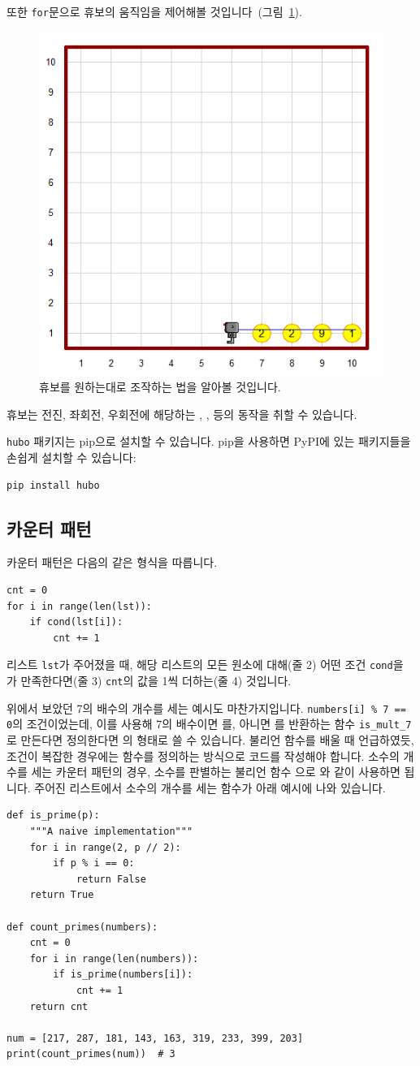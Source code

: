 \documentclass[../main.tex]{subfiles}
\begin{document}
또한 \texttt{for}문으로 휴보의 움직임을 제어해볼 것입니다~(그림~\ref{fig:lecture4:example}).
\begin{figure}[H]
\centering
\includegraphics[width=0.5\linewidth]{"./lectures/lecture4_example"}
\caption{휴보를 원하는대로 조작하는 법을 알아볼 것입니다.}\label{fig:lecture4:example}
\end{figure}
휴보는 전진, 좌회전, 우회전에 해당하는 , ,  등의 동작을 취할 수 있습니다.

\verb/hubo/ 패키지는 pip으로 설치할 수 있습니다.
pip을 사용하면 PyPI에 있는 패키지들을 손쉽게 설치할 수 있습니다:
\begin{verbatim}
pip install hubo
\end{verbatim}

\subsection{카운터 패턴}
카운터 패턴은 다음의 같은 형식을 따릅니다.
\begin{verbatim}
cnt = 0
for i in range(len(lst)):
    if cond(lst[i]):
        cnt += 1
\end{verbatim}
리스트 \texttt{lst}가 주어졌을 때, 해당 리스트의 모든 원소에 대해(줄 2) 어떤 조건 \texttt{cond}을 가 만족한다면(줄 3) \texttt{cnt}의 값을 1씩 더하는(줄 4) 것입니다.

위에서 보았던 7의 배수의 개수를 세는 예시도 마찬가지입니다.
\texttt{numbers[i] \% 7 == 0}의 조건이었는데, 이를 사용해 7의 배수이면 를, 아니면 를 반환하는 함수 \verb/is_mult_7/로 만든다면 정의한다면 의 형태로 쓸 수 있습니다.
불리언 함수를 배울 때 언급하였듯, 조건이 복잡한 경우에는 함수를 정의하는 방식으로 코드를 작성해야 합니다.
소수의 개수를 세는 카운터 패턴의 경우, 소수를 판별하는 불리언 함수 으로 와 같이 사용하면 됩니다.
주어진 리스트에서 소수의 개수를 세는 함수가 아래 예시에 나와 있습니다.
\begin{verbatim}
def is_prime(p):
    """A naive implementation"""
    for i in range(2, p // 2):
        if p % i == 0:
            return False
    return True

def count_primes(numbers):
    cnt = 0
    for i in range(len(numbers)):
        if is_prime(numbers[i]):
            cnt += 1
    return cnt

num = [217, 287, 181, 143, 163, 319, 233, 399, 203]
print(count_primes(num))  # 3
\end{verbatim}
\end{document}
